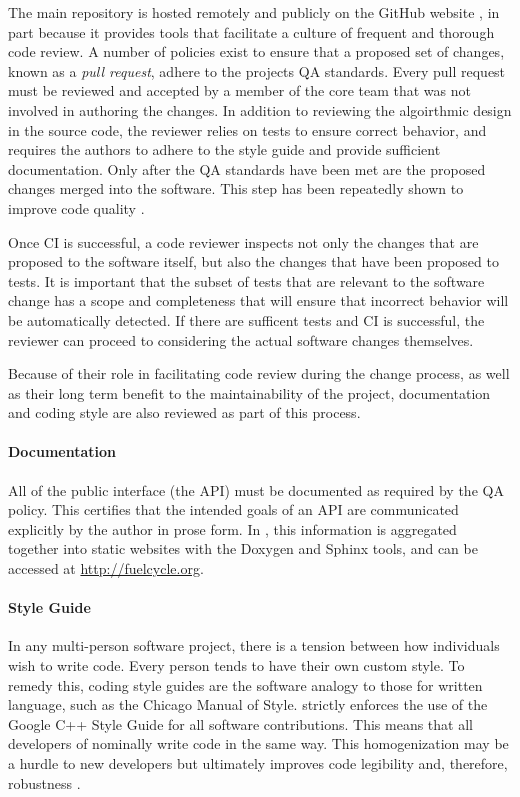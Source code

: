 The main \Cyclus repository is hosted remotely and publicly on the GitHub
website \cite{dabbish_social_2012}, in part because it provides tools that
facilitate a culture of frequent and thorough code review.  A number of
policies exist to ensure that a proposed set of changes, known as a \emph{pull
  request}, adhere to the projects \gls{QA} standards. Every pull request must
be reviewed and accepted by a member of the \Cyclus core team that was not
involved in authoring the changes.  In addition to reviewing the algoirthmic
design in the source code, the reviewer relies on tests to ensure correct
behavior, and requires the authors to adhere to the style guide and provide
sufficient documentation.  Only after the \gls{QA} standards have been met are
the proposed changes merged into the software. This step has been repeatedly
shown to improve code quality \cite{cohen_modern_2010}.

Once \gls{CI} is successful, a code reviewer inspects not only the
changes that are proposed to the software itself, but also the changes that
have been proposed to tests.  It is important that the subset of tests that
are relevant to the software change has a scope and completeness that will
ensure that incorrect behavior will be automatically detected.  If there are
sufficent tests and \gls{CI} is successful, the reviewer can proceed to
considering the actual software changes themselves.

Because of their role in facilitating code review during the change process,
as well as their long term benefit to the maintainability of the project,
documentation and coding style are also reviewed as part of this process.

\paragraph{Documentation}

All of the public interface (the \gls{API}) must be documented as required by
the \Cyclus \gls{QA} policy. This certifies that the intended goals of an
\gls{API} are communicated explicitly by the author in prose form.  In \Cyclus,
this information is aggregated together into static websites with the Doxygen
\cite{van_heesch_doxygen:_2008} and Sphinx \cite{brandl_sphinx_2014} tools, and
can be accessed at \url{http://fuelcycle.org}.

\paragraph{Style Guide}

In any multi-person software project, there is a tension between how individuals
wish to write code. Every person tends to have their own custom style. To remedy this,
coding style guides are the software analogy to those for written language,
such as the Chicago Manual of Style. \Cyclus strictly enforces the use of the
Google C++ Style Guide \cite{weinberger_google_2008} for all software contributions.
This means that all developers of \Cyclus nominally write \Cyclus code in the same
way.  This homogenization may be a hurdle to new developers but ultimately
improves code legibility and, therefore, robustness \cite{cohen_modern_2010}.

